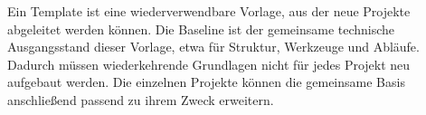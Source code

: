 \begin{beginnerstatement}

Ein Template ist eine wiederverwendbare Vorlage, aus der neue Projekte
abgeleitet werden können. Die Baseline ist der gemeinsame technische
Ausgangsstand dieser Vorlage, etwa für Struktur, Werkzeuge und Abläufe. Dadurch
müssen wiederkehrende Grundlagen nicht für jedes Projekt neu aufgebaut werden.
Die einzelnen Projekte können die gemeinsame Basis anschließend passend zu
ihrem Zweck erweitern.

\end{beginnerstatement}
